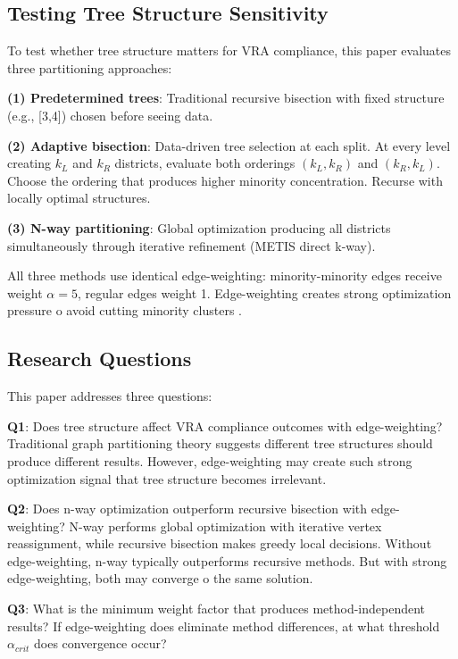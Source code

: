 \subsection{Testing Tree Structure Sensitivity}

To test whether tree structure matters for VRA compliance, this paper evaluates three partitioning approaches:

\textbf{(1) Predetermined trees}: Traditional recursive bisection with fixed structure (e.g., [3,4]) chosen before seeing data.

\textbf{(2) Adaptive bisection}: Data-driven tree selection at each split. At every level creating $k_L$ and $k_R$ districts, evaluate both orderings $(k_L, k_R)$ and $(k_R, k_L)$. Choose the ordering that produces higher minority concentration. Recurse with locally optimal structures.

\textbf{(3) N-way partitioning}: Global optimization producing all districts simultaneously through iterative refinement (METIS direct k-way).

All three methods use identical edge-weighting: minority-minority edges receive weight $\alpha = 5$, regular edges weight 1. Edge-weighting creates strong optimization pressure 	o avoid cutting minority clusters \citep{dellaLibera2026nwayRecursive}.

\subsection{Research Questions}

This paper addresses three questions:

\textbf{Q1}: Does tree structure affect VRA compliance outcomes with edge-weighting? Traditional graph partitioning theory suggests different tree structures should produce different results. However, edge-weighting may create such strong optimization signal that tree structure becomes irrelevant.

\textbf{Q2}: Does n-way optimization outperform recursive bisection with edge-weighting? N-way performs global optimization with iterative vertex reassignment, while recursive bisection makes greedy local decisions. Without edge-weighting, n-way typically outperforms recursive methods. But with strong edge-weighting, both may converge 	o the same solution.

\textbf{Q3}: What is the minimum weight factor that produces method-independent results? If edge-weighting does eliminate method differences, at what threshold $\alpha_{crit}$ does convergence occur?


